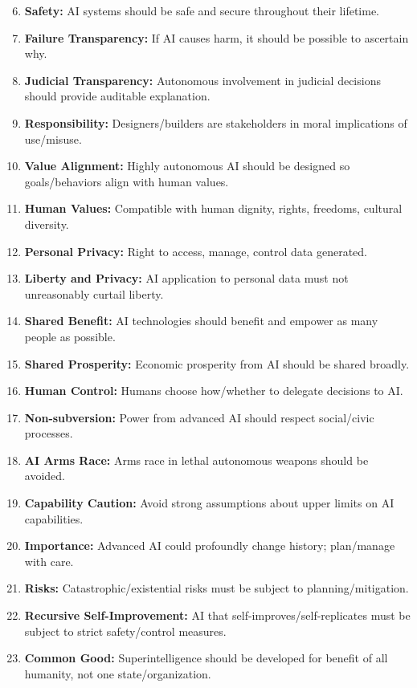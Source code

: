 \begin{keybox}
\begin{enumerate}
  \setcounter{enumi}{5}
  \item \textbf{Safety:} AI systems should be safe and secure throughout their lifetime.
  \item \textbf{Failure Transparency:} If AI causes harm, it should be possible to ascertain why.
  \item \textbf{Judicial Transparency:} Autonomous involvement in judicial decisions should provide auditable explanation.
  \item \textbf{Responsibility:} Designers/builders are stakeholders in moral implications of use/misuse.
  \item \textbf{Value Alignment:} Highly autonomous AI should be designed so goals/behaviors align with human values.
  \item \textbf{Human Values:} Compatible with human dignity, rights, freedoms, cultural diversity.
  \item \textbf{Personal Privacy:} Right to access, manage, control data generated.
  \item \textbf{Liberty and Privacy:} AI application to personal data must not unreasonably curtail liberty.
  \item \textbf{Shared Benefit:} AI technologies should benefit and empower as many people as possible.
  \item \textbf{Shared Prosperity:} Economic prosperity from AI should be shared broadly.
  \item \textbf{Human Control:} Humans choose how/whether to delegate decisions to AI.
  \item \textbf{Non-subversion:} Power from advanced AI should respect social/civic processes.
  \item \textbf{AI Arms Race:} Arms race in lethal autonomous weapons should be avoided.
\end{enumerate}
\end{keybox}

\begin{keybox}
\begin{enumerate}
  \setcounter{enumi}{18}
  \item \textbf{Capability Caution:} Avoid strong assumptions about upper limits on AI capabilities.
  \item \textbf{Importance:} Advanced AI could profoundly change history; plan/manage with care.
  \item \textbf{Risks:} Catastrophic/existential risks must be subject to planning/mitigation.
  \item \textbf{Recursive Self-Improvement:} AI that self-improves/self-replicates must be subject to strict safety/control measures.
  \item \textbf{Common Good:} Superintelligence should be developed for benefit of all humanity, not one state/organization.
\end{enumerate}
\end{keybox}

